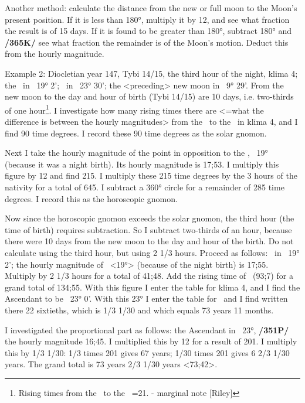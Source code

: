 Another method: calculate the distance from the new or full moon to the Moon’s present position. If it is less than 180°, multiply it by 12, and see what fraction the result is of 15 days. If it is found to be greater than 180°, subtract 180° and \textbf{/365K/} see what fraction the remainder is of the Moon’s motion. Deduct this from the hourly magnitude.

Example 2: Diocletian year 147, Tybi 14/15, the third hour of the night, klima 4; the \Sun\, in \Capricorn\, 19° 2'; \Moon\, in \Taurus\, 23° 30'; the <preceding> new moon in \Capricorn\, 9° 29'. From the new moon to the day and hour of birth (Tybi 14/15) are 10 days, i.e. two-thirds of one hour\footnote{Rising times from the \Sun\, to the \Moon\, =21. - marginal note [Riley]}. I investigate how many rising times there are <=what the difference is between the hourly magnitudes> from the \Sun\, to the \Moon\, in klima 4, and I find 90 time degrees. I record these 90 time degrees as the solar gnomon. 

Next I take the hourly magnitude of the point in opposition to the \Sun, \Cancer\, 19° (because it was a night birth). Its hourly magnitude is 17;53. I multiply this figure by 12 and find 215. I multiply these 215 time degrees by the 3 hours of the nativity for a total of 645. I subtract a 360° circle for a remainder of 285 time degrees. I record this as the horoscopic gnomon. 

Now since the horoscopic gnomon exceeds the solar gnomon, the
third hour (the time of birth) requires subtraction. So I subtract two-thirds of an hour, because there were 10 days from the new moon to the day and hour of the birth. Do not calculate using the third hour, but
using 2 1/3 hours. Proceed as follows: \Sun\, in \Capricorn\, 19° 2'; the hourly magnitude of \Cancer\, <19°> (because of the night birth) is 17;55. Multiply by 2 1/3 hours for a total of 41;48. Add the rising time of \Cancer\, (93;7) for a grand total of 134;55. With this figure I enter the table for klima 4, and I find the Ascendant to be \Leo\, 23° 0'. With this 23° I enter the table for \Leo\, and I find written there 22 sixtieths, which is 1/3 1/30 and which equals 73 years 11 months. 

I investigated the proportional part as follows: the Ascendant in \Leo\, 23°, \textbf{/351P/} the hourly magnitude 16;45. I multiplied this by 12 for a result of 201. I multiply this by 1/3 1/30: 1/3 times 201 gives 67 years; 1/30 times 201 gives 6 2/3 1/30 years. The
grand total is 73 years 2/3 1/30 years <73;42>.

